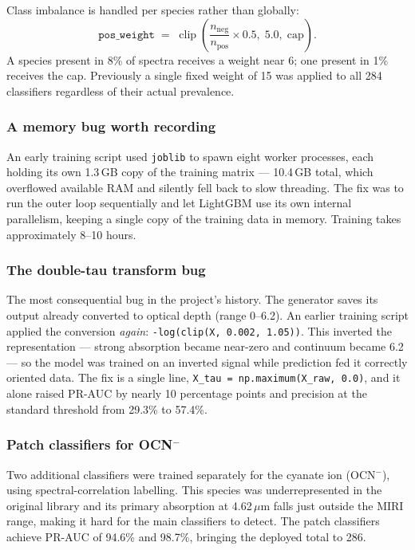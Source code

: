 \documentclass[11pt,a4paper]{article}
\newcommand{\um}{\,$\mu$m}
\newcommand{\code}[1]{\texttt{\small #1}}
\newcommand{\ocn}{OCN$^-$}
\begin{document}
Class imbalance is handled per species rather than globally:
\[
  \texttt{pos\_weight} \;=\;
  \operatorname{clip}\!\left(\frac{n_{\text{neg}}}{n_{\text{pos}}}
  \times 0.5,\; 5.0,\; \text{cap}\right).
\]
A species present in 8\% of spectra receives a weight near 6; one present
in 1\% receives the cap. Previously a single fixed weight of 15 was applied
to all 284 classifiers regardless of their actual prevalence.

\subsubsection*{A memory bug worth recording}

An early training script used \code{joblib} to spawn eight worker
processes, each holding its own 1.3\,GB copy of the training matrix ---
10.4\,GB total, which overflowed available RAM and silently fell back to
slow threading. The fix was to run the outer loop sequentially and let
LightGBM use its own internal parallelism, keeping a single copy of the
training data in memory. Training takes approximately 8--10 hours.

\subsubsection*{The double-tau transform bug}

The most consequential bug in the project's history. The generator saves
its output already converted to optical depth (range 0--6.2). An earlier
training script applied the conversion \emph{again}:
\code{-log(clip(X, 0.002, 1.05))}. This inverted the representation ---
strong absorption became near-zero and continuum became 6.2 --- so the
model was trained on an inverted signal while prediction fed it correctly
oriented data. The fix is a single line, \code{X\_tau = np.maximum(X\_raw,
0.0)}, and it alone raised PR-AUC by nearly 10 percentage points and
precision at the standard threshold from 29.3\% to 57.4\%.

\subsubsection*{Patch classifiers for \ocn}

Two additional classifiers were trained separately for the cyanate ion
(\ocn), using spectral-correlation labelling. This species was
underrepresented in the original library and its primary absorption at
4.62\um{} falls just outside the MIRI range, making it hard for the main
classifiers to detect. The patch classifiers achieve PR-AUC of 94.6\% and
98.7\%, bringing the deployed total to 286.
\end{document}
